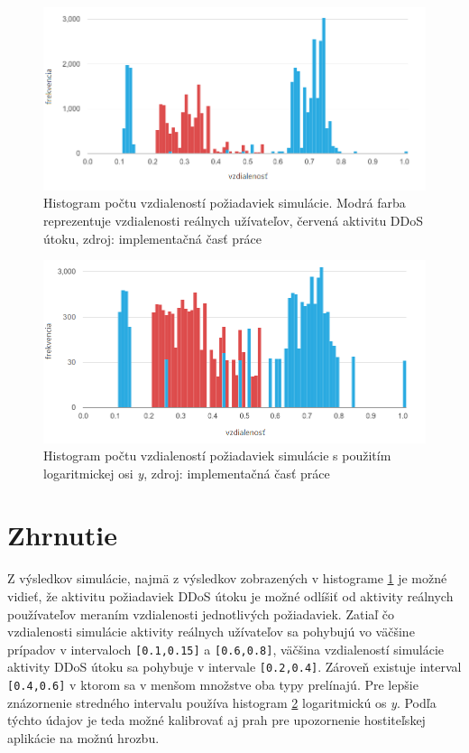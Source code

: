 \documentclass[
  digital, %
  oneside, %
  table,   %
  lof,     %
  nolot,   %
  nocover
]{fithesis3}
\begin{document}
\begin{figure}[h]
  \centering
    \includegraphics[width=\textwidth]{images/data-histogram-new.png}
  \caption{Histogram počtu vzdialeností požiadaviek simulácie. Modrá farba
  reprezentuje vzdialenosti reálnych užívateľov, červená aktivitu DDoS útoku,
  zdroj: implementačná časť práce}
  \label{fig:data-histogram}
\end{figure}

\begin{figure}[h]
  \centering
    \includegraphics[width=\textwidth]{images/data-histogram-log-new.png}
  \caption{Histogram počtu vzdialeností požiadaviek simulácie s použitím logaritmickej
  osi \textit{y}, zdroj: implementačná časť práce}
  \label{fig:data-histogram-log}
\end{figure}

\section{Zhrnutie}
Z výsledkov simulácie, najmä z výsledkov zobrazených v histograme
\ref{fig:data-histogram} je možné vidieť, že aktivitu požiadaviek DDoS útoku je
možné odlíšiť od aktivity reálnych používateľov meraním vzdialenosti
jednotlivých požiadaviek. Zatiaľ čo vzdialenosti simulácie aktivity reálnych
užívateľov sa pohybujú vo väčšine prípadov v intervaloch \texttt{[0.1,0.15]} a \texttt{[0.6,0.8]},
väčšina vzdialeností simulácie aktivity DDoS útoku sa pohybuje v intervale
\texttt{[0.2,0.4]}. Zároveň existuje interval \texttt{[0.4,0.6]} v ktorom sa v menšom
množstve oba typy prelínajú. Pre lepšie znázornenie stredného intervalu používa
histogram \ref{fig:data-histogram-log} logaritmickú os \textit{y}.
Podľa týchto údajov je teda možné kalibrovať aj prah pre
upozornenie hostiteľskej aplikácie na možnú hrozbu. 
\end{document}
